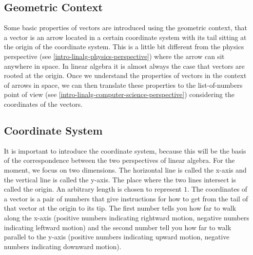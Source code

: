 \documentclass[
]{book}
\begin{document}
\hypertarget{intro-linalg-geometric-context}{%
\subsection{Geometric Context}\label{intro-linalg-geometric-context}}

Some basic properties of vectors are introduced using the geometric context, that a vector is an arrow located in a certain coordinate system with its tail sitting at the origin of the coordinate system. This is a little bit different from the physics perspective (see \ref{intro-linalg-physics-perspective}) where the arrow can sit anywhere in space. In linear algebra it is almost always the case that vectors are rooted at the origin. Once we understand the properties of vectors in the context of arrows in space, we can then translate these properties to the list-of-numbers point of view (see \ref{intro-linalg-computer-science-perspective}) considering the coordinates of the vectors.

\hypertarget{intro-linalg-coordinate-system}{%
\subsection{Coordinate System}\label{intro-linalg-coordinate-system}}

It is important to introduce the coordinate system, because this will be the basis of the correspondence between the two perspectives of linear algebra. For the moment, we focus on two dimensions. The horizontal line is called the x-axis and the vertical line is called the y-axis. The place where the two lines intersect is called the origin. An arbitrary length is chosen to represent \(1\). The coordinates of a vector is a pair of numbers that give instructions for how to get from the tail of that vector at the origin to its tip. The first number tells you how far to walk along the x-axis (positive numbers indicating rightward motion, negative numbers indicating leftward motion) and the second number tell you how far to walk parallel to the y-axis (positive numbers indicating upward motion, negative numbers indicating downward motion).
\end{document}
